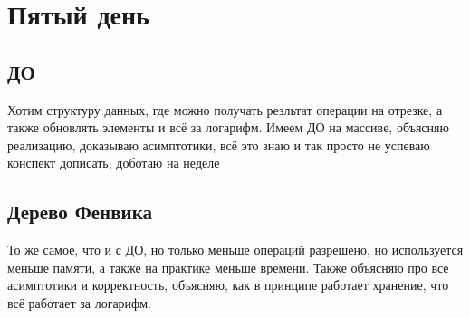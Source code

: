 \documentclass[a4paper, 12pt]{article}
\theoremstyle{plain}
\theoremstyle{definition}
\theoremstyle{remark}
\begin{document}
\section{Пятый день}
\subsection{ДО}
Хотим структуру данных, где можно получать резльтат операции на отрезке, а также обновлять элементы и всё за логарифм. Имеем ДО на массиве, объясняю реализацию, доказываю асимптотики, всё это знаю и так просто не успеваю конспект дописать, доботаю на неделе
\subsection{Дерево Фенвика}
То же самое, что и с ДО, но только меньше операций разрешено, но используется меньше памяти, а также на практике меньше времени. Также объясняю про все асимптотики и корректность, объясняю, как в принципе работает хранение, что всё работает за логарифм.
\end{document}
